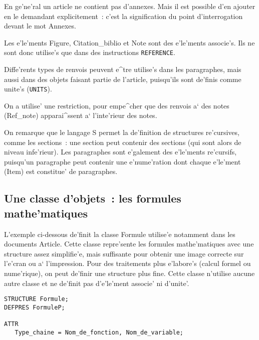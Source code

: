 {En ge'ne'ral un article ne contient pas d'annexes. Mais il est possible
d'en ajouter en le demandant explicitement~: c'est la signification du
point d'interrogation devant le mot Annexes.

Les e'le'ments Figure, Citation\_biblio et Note sont des e'le'ments associe's.
Ils ne sont donc utilise's que dans des instructions {\tt REFERENCE}.

Diffe'rents types de renvois peuvent e^tre utilise's dans les
paragraphes, mais aussi dans des objets faisant partie de l'article,
puisqu'ils sont de'finis comme unite's ({\tt UNITS}).

On a utilise' une restriction, pour empe^cher que des renvois a` des notes
(Ref\_note) apparai^ssent a` l'inte'rieur des notes.

On remarque que le langage S permet la de'finition de structures re'cursives,
comme les sections~: une section peut contenir des sections (qui sont alors
de niveau infe'rieur). Les paragraphes sont e'galement des e'le'ments re'cursifs,
puisqu'un paragraphe peut contenir une e'nume'ration dont chaque e'le'ment
(Item) est constitue' de paragraphes.

\subsection{Une classe d'objets~: les formules mathe'matiques}

L'exemple ci-dessous de'finit la classe Formule utilise'e notamment dans les
documents Article. Cette classe repre'sente les formules mathe'matiques avec
une structure assez simplifie'e, mais suffisante pour obtenir une image
correcte sur l'e'cran ou a` l'impression. Pour des traitements plus e'labore's
(calcul formel ou nume'rique), on peut de'finir une structure plus fine.
Cette classe n'utilise aucune autre classe et ne de'finit pas d'e'le'ment
associe' ni d'unite'.

\begin{verbatim}
STRUCTURE Formule;
DEFPRES FormuleP;

ATTR
   Type_chaine = Nom_de_fonction, Nom_de_variable;


\end{verbatim}}
